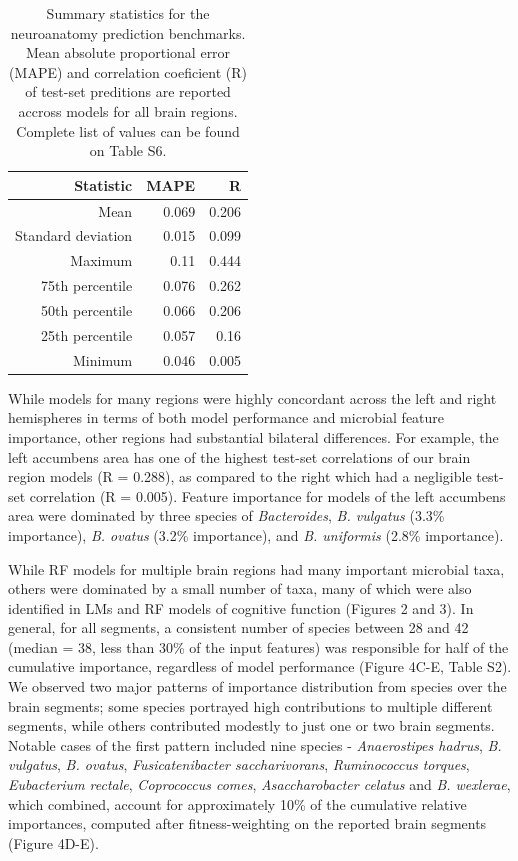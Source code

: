 \documentclass{article}
\begin{document}
\begin{table}[!h]
    \begin{center}
    \begin{tabular}{|r|r|r|}
      \hline\hline
      \textbf{Statistic} & \textbf{MAPE} & \textbf{R} \\\hline
      Mean & 0.069 & 0.206 \\
      Standard deviation & 0.015 & 0.099 \\
      Maximum & 0.11 & 0.444 \\
      75th percentile & 0.076 & 0.262 \\
      50th percentile & 0.066 & 0.206 \\
      25th percentile & 0.057 & 0.16 \\
      Minimum & 0.046 & 0.005 \\\hline
    \end{tabular}
    \caption{\label{tab:neuro}Summary statistics for the neuroanatomy prediction benchmarks.
    Mean absolute proportional error (MAPE) and correlation coeficient (R)
    of test-set preditions are reported accross models for all brain regions.
    Complete list of values can be found on Table S6.}
    \end{center}
\end{table}

While models for many regions were highly concordant across the
left and right hemispheres in terms of both model performance and
microbial feature importance, other regions had substantial
bilateral differences. For example, the left accumbens area
has one of the highest test-set correlations of our
brain region models (R = 0.288), as compared to the right which
had a negligible test-set correlation (R = 0.005).
Feature importance for models of the left accumbens area were dominated
by three species of \emph{Bacteroides}, \emph{B. vulgatus} (3.3\% importance),
\emph{B. ovatus} (3.2\% importance), and
\emph{B. uniformis} (2.8\% importance).

While RF models for multiple brain regions had many important microbial taxa,
others were dominated by a small number of taxa, many of which
were also identified in LMs and RF models of cognitive function (Figures 2 and 3). 
In general, for all segments, a consistent number of species between 28 and 42 (median = 38, less than 30\% of the input features)
was responsible for half of the cumulative importance,
regardless of model performance (Figure 4C-E, Table S2).
We observed two major patterns of importance distribution from
species over the brain segments; some species portrayed high contributions
to multiple different segments, while others contributed modestly to
just one or two brain segments. Notable cases of the first pattern
included nine species - 
\emph{Anaerostipes hadrus},
\emph{B. vulgatus},
\emph{B. ovatus},
\emph{Fusicatenibacter saccharivorans},
\emph{Ruminococcus torques},
\emph{Eubacterium rectale},
\emph{Coprococcus comes},
\emph{Asaccharobacter celatus} and
\emph{B. wexlerae}, which combined, account for approximately 10\% of the cumulative relative importances,
computed after fitness-weighting on the reported brain segments (Figure 4D-E).
\end{document}

